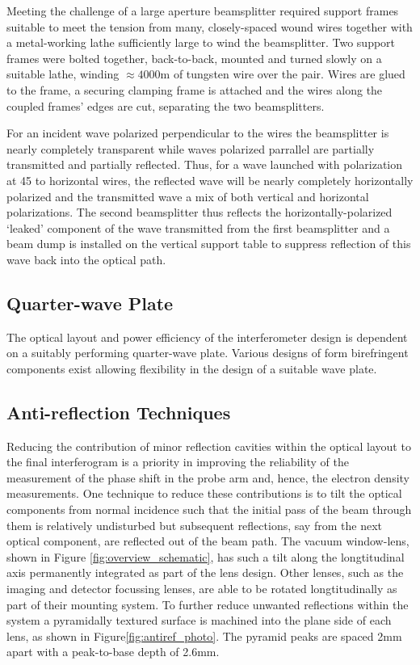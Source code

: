 Meeting the challenge of a large aperture beamsplitter required
support frames suitable to meet the tension from many, closely-spaced
wound wires together with a metal-working lathe sufficiently large to
wind the beamsplitter.
Two support frames were bolted together, back-to-back, mounted and
turned slowly on a suitable lathe, winding $\approx 4000$\ts{}m of
tungsten wire over the pair.
Wires are glued to the frame, a securing clamping frame is attached
and the wires along the coupled frames' edges are cut, separating the
two beamsplitters.

For an incident wave polarized perpendicular to the wires the
beamsplitter is nearly completely transparent while waves polarized
parrallel are partially transmitted and partially reflected.\cite[p.280]{MARCUVITZ1951}
Thus, for a wave launched with polarization at 45\degrees{} to
horizontal wires, the reflected wave will be nearly completely
horizontally polarized and the transmitted wave a mix of both vertical
and horizontal polarizations.
The second beamsplitter thus reflects the horizontally-polarized
`leaked' component of the wave transmitted from the first beamsplitter
and a beam dump is installed on the vertical support table to suppress
reflection of this wave back into the optical path.

\subsection{Quarter-wave Plate}
The optical layout and power efficiency of the interferometer design
is dependent on a suitably performing quarter-wave plate. Various designs
of form birefringent components exist\cite{VANVLIET81} allowing
flexibility in the design of a suitable wave plate. 

\subsection{Anti-reflection Techniques}
\label{sec:antiref_techniques}
Reducing the contribution of minor reflection cavities within the
optical layout to the final interferogram is a priority in improving
the reliability of the measurement of the phase shift in the probe arm
and, hence, the electron density measurements.
One technique to reduce these contributions is to tilt the optical
components from normal incidence such that the initial pass of the
beam through them is relatively undisturbed but subsequent
reflections, say from the next optical component, are reflected out of
the beam path.
The vacuum window-lens, shown in Figure \ref{fig:overview_schematic},
has such a tilt along the longtitudinal axis permanently integrated as
part of the lens design.
Other lenses, such as the imaging and detector focussing lenses, are
able to be rotated longtitudinally as part of their mounting system.
To further reduce unwanted reflections within the system a pyramidally
textured surface\cite{DEINEGA2010} is machined into the plane side
of each lens, as shown in Figure\ref{fig:antiref_photo}.
The pyramid peaks are spaced 2\ts{}mm apart with a peak-to-base depth
of 2.6\ts{}mm.
